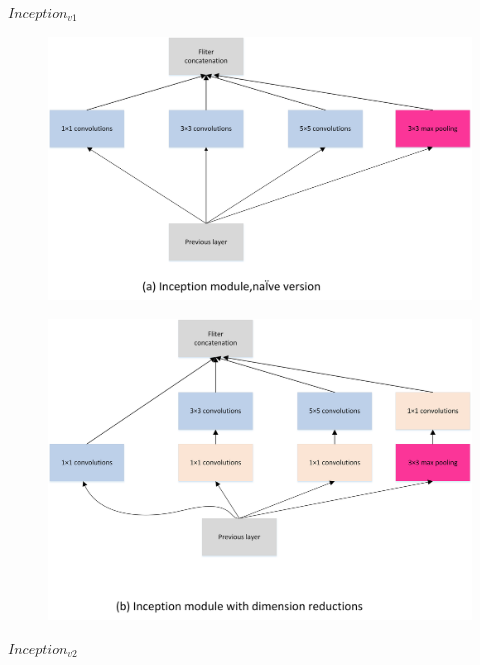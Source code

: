 \(Inception_{v1}\)

\begin{figure}
\centering
\includegraphics{./img/ch4/image27.png}
\caption{}
\end{figure}

\begin{figure}
\centering
\includegraphics{./img/ch4/image28.png}
\caption{}
\end{figure}

\(Inception_{v2}\)

